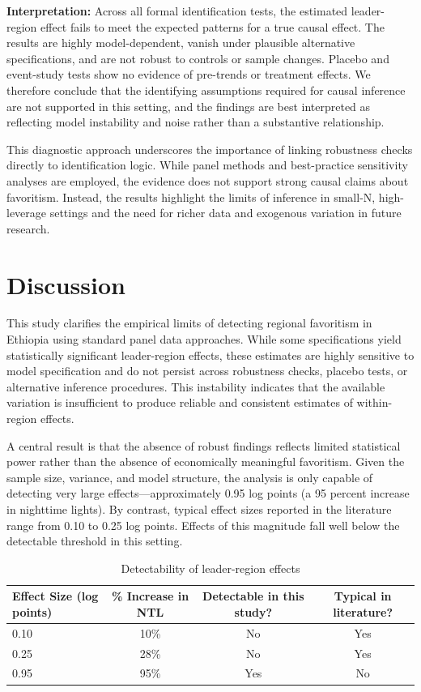 \documentclass[12pt,a4paper]{article}
\begin{document}
\noindent
\textbf{Interpretation:} Across all formal identification tests, the estimated leader-region effect fails to meet the expected patterns for a true causal effect. The results are highly model-dependent, vanish under plausible alternative specifications, and are not robust to controls or sample changes. Placebo and event-study tests show no evidence of pre-trends or treatment effects. We therefore conclude that the identifying assumptions required for causal inference are not supported in this setting, and the findings are best interpreted as reflecting model instability and noise rather than a substantive relationship.

This diagnostic approach underscores the importance of linking robustness checks directly to identification logic. While panel methods and best-practice sensitivity analyses are employed, the evidence does not support strong causal claims about favoritism. Instead, the results highlight the limits of inference in small-N, high-leverage settings and the need for richer data and exogenous variation in future research.

\section{Discussion}

This study clarifies the empirical limits of detecting regional favoritism in Ethiopia using standard panel data approaches. While some specifications yield statistically significant leader-region effects, these estimates are highly sensitive to model specification and do not persist across robustness checks, placebo tests, or alternative inference procedures. This instability indicates that the available variation is insufficient to produce reliable and consistent estimates of within-region effects.

A central result is that the absence of robust findings reflects limited statistical power rather than the absence of economically meaningful favoritism. Given the sample size, variance, and model structure, the analysis is only capable of detecting very large effects—approximately 0.95 log points (a 95 percent increase in nighttime lights). By contrast, typical effect sizes reported in the literature range from 0.10 to 0.25 log points. Effects of this magnitude fall well below the detectable threshold in this setting.

\begin{table}[ht]
	\centering
	\caption{Detectability of leader-region effects}
\begin{tabular}{lccc}
\toprule
Effect Size (log points) & \% Increase in NTL & Detectable in this study? & Typical in literature? \\
\midrule
0.10 & 10\% & No & Yes \\
0.25 & 28\% & No & Yes \\
0.95 & 95\% & Yes & No \\
\bottomrule
\end{tabular}
\end{table}
\end{document}
